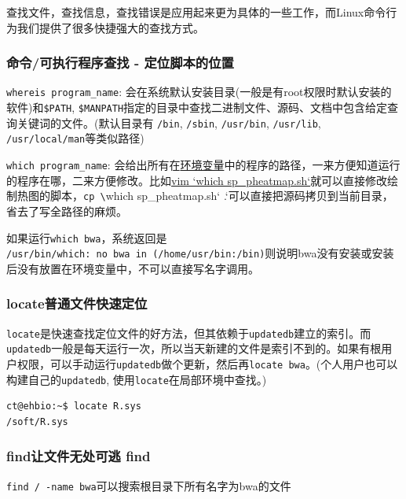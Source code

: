 \documentclass[]{article}
\numberwithin{figure}{section}
\numberwithin{table}{section}
\begin{document}
查找文件，查找信息，查找错误是应用起来更为具体的一些工作，而Linux命令行为我们提供了很多快捷强大的查找方式。

\hypertarget{seach_cmmand}{%
\subsubsection{命令/可执行程序查找 - 定位脚本的位置}\label{seach_cmmand}}

\texttt{whereis\ program\_name}: 会在系统默认安装目录(一般是有root权限时默认安装的软件)和\texttt{\$PATH}, \texttt{\$MANPATH}指定的目录中查找二进制文件、源码、文档中包含给定查询关键词的文件。(默认目录有 \texttt{/bin}, \texttt{/sbin}, \texttt{/usr/bin}, \texttt{/usr/lib}, \texttt{/usr/local/man}等类似路径)

\texttt{which\ program\_name}: 会给出所有在\href{http://mp.weixin.qq.com/s/poFpNHQgHDr0qr2wqfVNdw}{环境变量}中的程序的路径，一来方便知道运行的程序在哪，二来方便修改。比如\href{https://mp.weixin.qq.com/s/_9LKs6t6rcjzokF_0gneSA}{vim `which sp\_pheatmap.sh`}就可以直接修改绘制热图的脚本，\texttt{cp\ \textbackslash{}}which sp\_pheatmap.sh` .`可以直接把源码拷贝到当前目录，省去了写全路径的麻烦。

如果运行\texttt{which\ bwa}，系统返回是 \texttt{/usr/bin/which:\ no\ bwa\ in\ (/home/usr/bin:/bin)}则说明bwa没有安装或安装后没有放置在环境变量中，不可以直接写名字调用。

\hypertarget{locate}{%
\subsubsection{locate普通文件快速定位}\label{locate}}

\texttt{locate}是快速查找定位文件的好方法，但其依赖于\texttt{updatedb}建立的索引。而\texttt{updatedb}一般是每天运行一次，所以当天新建的文件是索引不到的。如果有根用户权限，可以手动运行\texttt{updatedb}做个更新，然后再\texttt{locate\ bwa}。(个人用户也可以构建自己的\texttt{updatedb}, 使用\texttt{locate}在局部环境中查找。)

\begin{verbatim}
ct@ehbio:~$ locate R.sys
/soft/R.sys
\end{verbatim}

\hypertarget{find}{%
\subsubsection{find让文件无处可逃 find}\label{find}}

\texttt{find\ /\ -name\ bwa}可以搜索根目录下所有名字为bwa的文件
\end{document}
